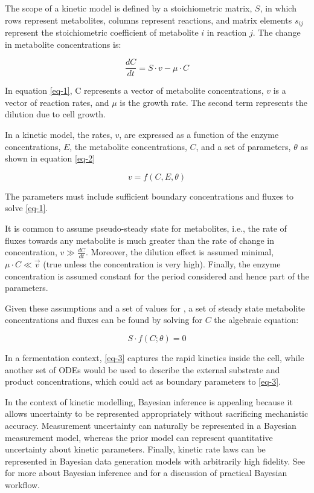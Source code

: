 \documentclass[journal=,manuscript=]{achemso}
\begin{document}
The scope of a kinetic model is defined by a stoichiometric matrix,
\(S\), in which rows represent metabolites, columns represent reactions,
and matrix elements \(s_{ij}\) represent the stoichiometric coefficient
of metabolite \(i\) in reaction \(j\). The change in metabolite
concentrations is:

\begin{equation}\label{eq-1}
\frac{dC}{dt} = S\cdot v - \mu\cdot C 
\end{equation}

In equation \eqref{eq-1}, C represents a vector of metabolite
concentrations, \(v\) is a vector of reaction rates, and \(\mu\) is the
growth rate. The second term represents the dilution due to cell growth.

In a kinetic model, the rates, \(v\), are expressed as a function of the
enzyme concentrations, \(E\), the metabolite concentrations, \(C\), and
a set of parameters, \(\theta\) as shown in equation \eqref{eq-2}

\begin{equation}\label{eq-2}
v = f(C, E, \theta)
\end{equation}

The parameters must include sufficient boundary concentrations and
fluxes to solve \eqref{eq-1}.

It is common to assume pseudo-steady state for metabolites, i.e., the
rate of fluxes towards any metabolite is much greater than the rate of
change in concentration, \(𝑣 \gg \frac{𝑑𝐶}{𝑑𝑡}\). Moreover, the dilution
effect is assumed minimal, \(\mu\cdot C \ll \vec{v}\) (true unless the
concentration is very high). Finally, the enzyme concentration is
assumed constant for the period considered and hence part of the
parameters.

Given these assumptions and a set of values for \theta, a set of steady
state metabolite concentrations and fluxes can be found by solving for
\(C\) the algebraic equation:

\begin{equation}\label{eq-3}
S\cdot f(C;\theta) = 0
\end{equation}

In a fermentation context, \eqref{eq-3} captures the rapid kinetics
inside the cell, while another set of ODEs would be used to describe the
external substrate and product concentrations, which could act as
boundary parameters to \eqref{eq-3}.

In the context of kinetic modelling, Bayesian inference is appealing
because it allows uncertainty to be represented appropriately without
sacrificing mechanistic accuracy. Measurement uncertainty can naturally
be represented in a Bayesian measurement model, whereas the prior model
can represent quantitative uncertainty about kinetic parameters.
Finally, kinetic rate laws can be represented in Bayesian data
generation models with arbitrarily high fidelity. See
\citet{gelmanBayesianDataAnalysis2020a} for more about Bayesian
inference and \citet{gelmanBayesianWorkflow2020} for a discussion of
practical Bayesian workflow.
\end{document}

